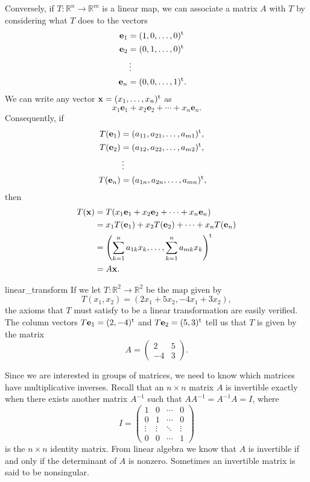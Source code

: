  
Conversely, if $T : {\mathbb R}^n \rightarrow {\mathbb R}^m$ is a linear
map, we can associate a matrix $A$ with $T$ by considering what $T$
does to the vectors 
\begin{align*}
{\mathbf e}_1 & = (1, 0, \ldots, 0)^{\rm t} \\
{\mathbf e}_2 & = (0, 1, \ldots, 0)^{\rm t} \\
            &  \vdots &  \\
{\mathbf e}_n & = (0, 0, \ldots, 1)^{\rm t}.
\end{align*}
We can write any vector ${\mathbf x} = (x_1, \ldots, x_n)^{\rm t}$ as
\[
x_1 {\mathbf e}_1 + x_2 {\mathbf e}_2 + \cdots + x_n {\mathbf e}_n.
\]
Consequently, if
\begin{align*}
T({\mathbf e}_1) & = (a_{11}, a_{21}, \ldots, a_{m1})^{\rm t}, \\
T({\mathbf e}_2) & = (a_{12}, a_{22}, \ldots, a_{m2})^{\rm t}, \\
            &  \vdots &  \\
T({\mathbf e}_n) & = (a_{1n}, a_{2n}, \ldots, a_{mn})^{\rm t},
\end{align*}
then
\begin{align*}
T({\mathbf x} )
& =
T(x_1 {\mathbf e}_1 + x_2 {\mathbf e}_2 + \cdots + x_n {\mathbf e}_n) \\
& =
x_1 T({\mathbf e}_1) + x_2 T({\mathbf e}_2) + \cdots + x_n T({\mathbf e}_n)
\\ 
& =
\left(
\sum_{k=1}^{n} a_{1k} x_k, \ldots,  \sum_{k=1}^{n} a_{mk} x_k
\right)^{\rm t} \\ 
& = 
A {\mathbf x}.
\end{align*}
 
 
\begin{example}{linear_transform}
If we let $T : {\mathbb R}^2 \rightarrow {\mathbb R}^2$ be the map given by 
\[
T(x_1, x_2) = (2 x_1 + 5 x_2, - 4 x_1 + 3 x_2),
\]
the axioms that $T$ must satisfy to be a linear transformation are
easily verified. The column vectors $T {\mathbf e}_1 = (2, -4)^{\rm t}$
and $T {\mathbf e}_2 = (5,3)^{\rm t}$  tell us that $T$ is given by the
matrix 
\[
A =
\begin{pmatrix}
2 & 5 \\
-4 & 3
\end{pmatrix}.
\]
\end{example}
 
 
Since we are interested in groups of matrices, we need to know
which matrices have multiplicative inverses. Recall that an $n \times
n$ matrix $A$ is {\bfi invertible\/} exactly
when there exists another matrix $A^{-1}$ such that $A A^{-1} = A^{-1}
A = I$, where 
\[
I =
\begin{pmatrix}
1 & 0 & \cdots & 0 \\
0 & 1 & \cdots & 0 \\
\vdots & \vdots & \ddots & \vdots \\
0 & 0 & \cdots & 1
\end{pmatrix}
\]
is the $n \times n$ identity matrix. From linear algebra we know that
$A$ is invertible if and only if the determinant of $A$ is nonzero.
Sometimes an invertible matrix is said to be {\bfi
nonsingular}. 
 
